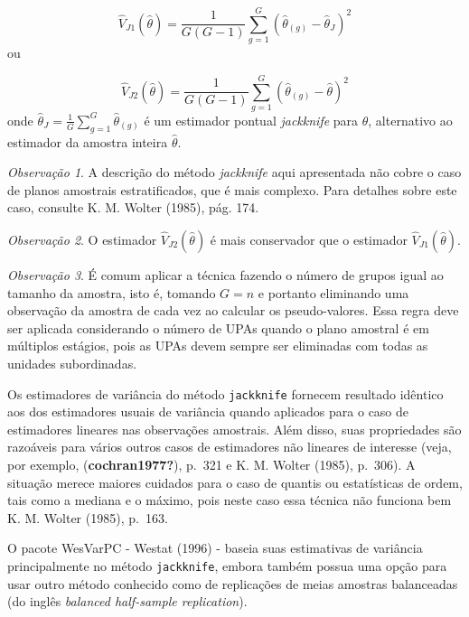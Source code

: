 \documentclass[
  12pt,
  brazilian,
]{book}
\theoremstyle{definition}
\theoremstyle{definition}
\theoremstyle{definition}
\theoremstyle{definition}
\theoremstyle{remark}
\newtheorem*{remark}{Observação }
\begin{document}
\[
\widehat{V}_{J1}\left( \widehat{\theta }\right) =\frac{1}{G\left( G-1\right) 
}\sum_{g=1}^{G}\left( \widehat{\theta }_{\left( g\right) }-\widehat{\theta }
_{J}\right) ^{2}  \label{eq:estpa25}
\]
ou

\[
\widehat{V}_{J2}\left( \widehat{\theta }\right) =\frac{1}{G\left( G-1\right) 
}\sum_{g=1}^{G}\left( \widehat{\theta }_{\left( g\right) }-\widehat{\theta }
\right) ^{2}  \label{eq:estpa26}
\]
onde \(\widehat{\theta }_{J} = \frac{1}{G} \sum_{g=1}^{G} \widehat{\theta }_{\left( g\right)}\) é um estimador pontual \emph{jackknife} para \(\theta\), alternativo ao estimador da amostra inteira \(\hat{\theta}\).

\begin{remark}
{}A descrição do método \emph{jackknife} aqui apresentada não cobre o caso de planos amostrais estratificados, que é mais complexo. Para detalhes sobre este caso, consulte K. M. Wolter (1985), pág. 174.
\end{remark}

\begin{remark}
{}O estimador \(\widehat{V}_{J2}\left( \widehat{\theta }\right)\) é mais conservador que o estimador \(\widehat{V}_{J1}\left( \widehat{\theta }\right)\).
\end{remark}

\begin{remark}
{}É comum aplicar a técnica fazendo o número de grupos igual ao tamanho da amostra, isto é, tomando \(G=n\) e portanto eliminando uma observação da amostra de cada vez ao calcular os pseudo-valores. Essa regra deve ser aplicada considerando o número de UPAs quando o plano amostral é em múltiplos estágios, pois as UPAs devem sempre ser eliminadas com todas as unidades subordinadas.
\end{remark}

Os estimadores de variância do método \texttt{jackknife} fornecem resultado idêntico aos dos estimadores usuais de variância quando aplicados para o caso de estimadores lineares nas observações amostrais. Além disso, suas propriedades são razoáveis para vários outros casos de estimadores não lineares de interesse (veja, por exemplo, (\textbf{cochran1977?}), p.~321 e K. M. Wolter (1985), p.~306). A situação merece maiores cuidados para o caso de quantis ou estatísticas de ordem, tais como a mediana e o máximo, pois neste caso essa técnica não funciona bem K. M. Wolter (1985), p.~163.

O pacote WesVarPC - Westat (1996) - baseia suas estimativas de variância principalmente no método \texttt{jackknife}, embora também possua uma opção para usar outro método conhecido como de replicações de meias amostras balanceadas (do inglês \emph{balanced half-sample replication}).
\end{document}
